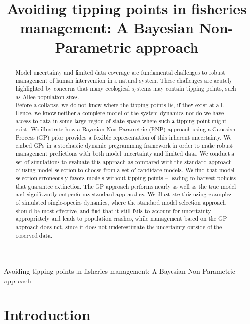 \documentclass[]{components/elsarticle}
\title{Avoiding tipping points in fisheries management: A Bayesian
Non-Parametric approach}
\author{ \and  \and }
\date{}
\begin{document}
\begin{center}
\huge Avoiding tipping points in fisheries management: A Bayesian
Non-Parametric approach \\[0.2cm]
\normalsize
\end{center}

\begin{abstract}
Model uncertainty and limited data coverage are fundamental challenges
to robust management of human intervention in a natural system. These
challenges are acutely highlighted by concerns that many ecological
systems may contain tipping points, such as Allee population
sizes.\\Before a collapse, we do not know where the tipping points lie,
if they exist at all. Hence, we know neither a complete model of the
system dynamics nor do we have access to data in some large region of
state-space where such a tipping point might exist. We illustrate how a
Bayesian Non-Parametric (BNP) approach using a Gaussian Process (GP)
prior provides a flexible representation of this inherent uncertainty.
We embed GPs in a stochastic dynamic programming framework in order to
make robust management predictions with both model uncertainty and
limited data. We conduct a set of simulations to evaluate this approach
as compared with the standard approach of using model selection to
choose from a set of candidate models. We find that model selection
erroneously favors models without tipping points -- leading to harvest
policies that guarantee extinction. The GP approach performs nearly as
well as the true model and significantly outperforms standard
appraoches. We illustrate this using examples of simulated
single-species dynamics, where the standard model selection approach
should be most effective, and find that it still fails to account for
uncertainty appropriately and leads to population crashes, while
management based on the GP approach does not, since it does not
underestimate the uncertainty outside of the observed data.
\end{abstract}

\section{Introduction}\label{introduction}
\end{document}
